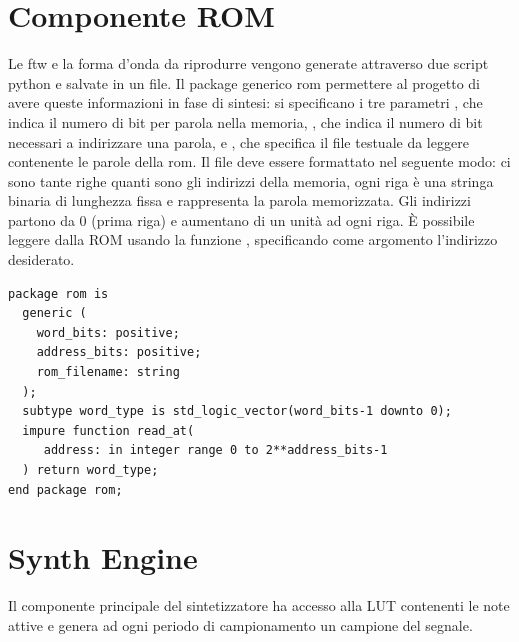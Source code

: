 \section{Componente ROM}
\label{sec:rom}
Le ftw e la forma d'onda da riprodurre vengono generate attraverso due
script python e salvate in un file.
Il package generico rom permettere al progetto di avere queste informazioni in fase di sintesi: si specificano i tre parametri , che indica il numero di bit per parola nella memoria, , che indica il numero di bit necessari a indirizzare una parola, e , che specifica il file testuale da leggere contenente le parole della rom.
Il file deve essere formattato nel seguente modo: ci sono tante righe quanti sono gli indirizzi della memoria, ogni riga è una stringa binaria
di lunghezza fissa e rappresenta la parola memorizzata.
Gli indirizzi partono da 0 (prima riga) e aumentano di un unità ad ogni riga.
È possibile leggere dalla ROM usando la funzione , specificando come argomento l'indirizzo desiderato.

\begin{verbatim}
package rom is
  generic (
    word_bits: positive;
    address_bits: positive;
    rom_filename: string
  );
  subtype word_type is std_logic_vector(word_bits-1 downto 0);
  impure function read_at(
     address: in integer range 0 to 2**address_bits-1
  ) return word_type;
end package rom;
\end{verbatim}

\section{Synth Engine}
\label{sec:synthengine}

\begin{center}
\end{center}


Il componente principale del sintetizzatore ha accesso alla LUT contenenti le note attive e genera ad ogni periodo di campionamento
un campione del segnale.

